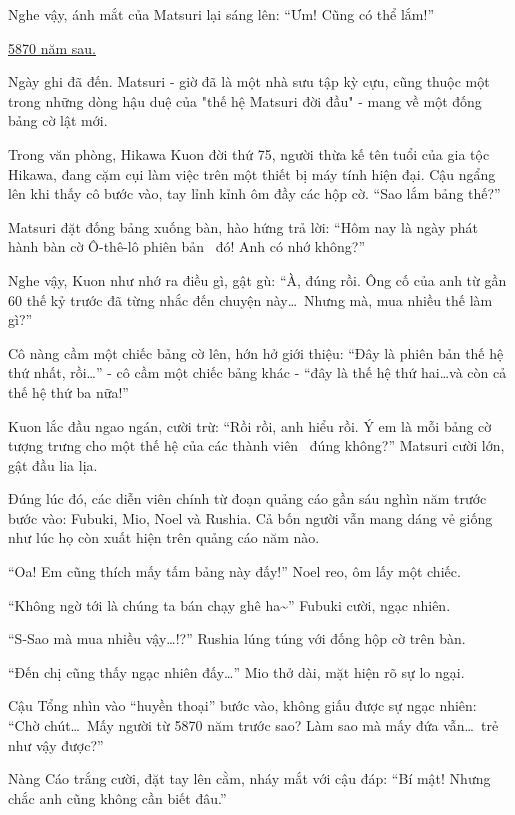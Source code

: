 \documentclass[../main.tex]{subfiles}
\begin{document}
Nghe vậy, ánh mắt của Matsuri lại sáng lên: ``Ưm! Cũng có thể lắm!''

\begin{center}
  \uline{5870 năm sau.}
\end{center}

Ngày ghi đã đến. Matsuri - giờ đã là một nhà sưu tập kỳ cựu, cũng thuộc một trong những dòng hậu duệ của "thế hệ Matsuri đời đầu" - mang về một đống bảng cờ lật mới.

Trong văn phòng, Hikawa Kuon đời thứ 75, người thừa kế tên tuổi của gia tộc Hikawa, đang cặm cụi làm việc trên một thiết bị máy tính hiện đại. Cậu ngẩng lên khi thấy cô bước vào, tay lỉnh kỉnh ôm đầy các hộp cờ. ``Sao lắm bảng thế?''


Matsuri đặt đống bảng xuống bàn, hào hứng trả lời: ``Hôm nay là ngày phát hành bàn cờ Ô-thê-lô phiên bản \hll\ đó! Anh có nhớ không?''

Nghe vậy, Kuon như nhớ ra điều gì, gật gù: ``À, đúng rồi. Ông cố của anh từ gần 60 thế kỷ trước đã từng nhắc đến chuyện này\dots\ Nhưng mà, mua nhiều thế làm gì?''

Cô nàng cầm một chiếc bảng cờ lên, hớn hở giới thiệu: ``Đây là phiên bản thế hệ thứ nhất, rồi\dots'' - cô cầm một chiếc bảng khác - ``đây là thế hệ thứ hai\dots và còn cả thế hệ thứ ba nữa!''

Kuon lắc đầu ngao ngán, cười trừ: ``Rồi rồi, anh hiểu rồi. Ý em là mỗi bảng cờ tượng trưng cho một thế hệ của các thành viên \hll\ đúng không?'' Matsuri cười lớn, gật đầu lia lịa.

Đúng lúc đó, các diễn viên chính từ đoạn quảng cáo gần sáu nghìn năm trước bước vào: Fubuki, Mio, Noel và Rushia. Cả bốn người vẫn mang dáng vẻ giống như lúc họ còn xuất hiện trên quảng cáo năm nào.

``Oa! Em cũng thích mấy tấm bảng này đấy!'' Noel reo, ôm lấy một chiếc.

``Không ngờ tới là chúng ta bán chạy ghê ha\~{}'' Fubuki cười, ngạc nhiên.

``S-Sao mà mua nhiều vậy\dots!?'' Rushia lúng túng với đống hộp cờ trên bàn.

``Đến chị cũng thấy ngạc nhiên đấy\dots'' Mio thở dài, mặt hiện rõ sự lo ngại.

Cậu Tổng nhìn vào ``huyền thoại'' bước vào, không giấu được sự ngạc nhiên: ``Chờ chút\dots\ Mấy người từ 5870 năm trước sao? Làm sao mà mấy đứa vẫn\dots\ trẻ như vậy được?''

Nàng Cáo trắng cười, đặt tay lên cằm, nháy mắt với cậu đáp: ``Bí mật! Nhưng chắc anh cũng không cần biết đâu.''
\end{document}
